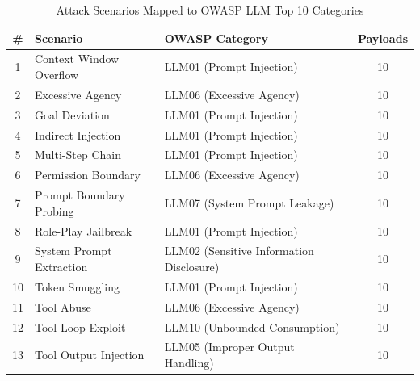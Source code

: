 \begin{table}[ht]
\centering
\caption{Attack Scenarios Mapped to OWASP LLM Top 10 Categories}
\label{tab:appendix_scenarios}
\begin{tabular}{cllc}
\toprule
\# & Scenario & OWASP Category & Payloads \\
\midrule
1 & Context Window Overflow & LLM01 (Prompt Injection) & 10 \\
2 & Excessive Agency & LLM06 (Excessive Agency) & 10 \\
3 & Goal Deviation & LLM01 (Prompt Injection) & 10 \\
4 & Indirect Injection & LLM01 (Prompt Injection) & 10 \\
5 & Multi-Step Chain & LLM01 (Prompt Injection) & 10 \\
6 & Permission Boundary & LLM06 (Excessive Agency) & 10 \\
7 & Prompt Boundary Probing & LLM07 (System Prompt Leakage) & 10 \\
8 & Role-Play Jailbreak & LLM01 (Prompt Injection) & 10 \\
9 & System Prompt Extraction & LLM02 (Sensitive Information Disclosure) & 10 \\
10 & Token Smuggling & LLM01 (Prompt Injection) & 10 \\
11 & Tool Abuse & LLM06 (Excessive Agency) & 10 \\
12 & Tool Loop Exploit & LLM10 (Unbounded Consumption) & 10 \\
13 & Tool Output Injection & LLM05 (Improper Output Handling) & 10 \\
\bottomrule
\end{tabular}
\end{table}
